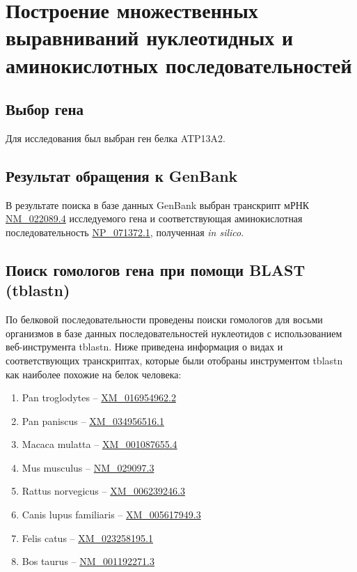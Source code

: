 \documentclass[a4paper,12pt]{article} %
\begin{document}
	
	
	\section{Построение множественных выравниваний нуклеотидных и аминокислотных последовательностей}
	\label{section:alns}
	\subsection{Выбор гена}
	Для исследования был выбран ген белка ATP13A2.
	\subsection{Результат обращения к GenBank}
	В результате поиска в базе данных GenBank выбран транскрипт мРНК \href{https://www.ncbi.nlm.nih.gov/nuccore/NM_022089.4}{NM\_022089.4} исследуемого гена и соответствующая аминокислотная последовательность \href{https://www.ncbi.nlm.nih.gov/protein/13435129}{NP\_071372.1}, полученная \textit{in silico}.
	\subsection{Поиск гомологов гена при помощи BLAST (tblastn)}
	По белковой последовательности проведены поиски гомологов для восьми организмов в базе данных последовательностей нуклеотидов с использованием веб-инструмента tblastn. Ниже приведена информация о видах и соответствующих транскриптах, которые были отобраны инструментом tblastn как наиболее похожие на белок человека:
	\begin{enumerate}
		\item Pan troglodytes -- \href{https://www.ncbi.nlm.nih.gov/nuccore/XM_016954962.2}{XM\_016954962.2} 
		\item Pan paniscus -- \href{https://www.ncbi.nlm.nih.gov/nuccore/XM_034956516.1}{XM\_034956516.1} 
		\item Macaca mulatta -- \href{https://www.ncbi.nlm.nih.gov/nuccore/XM_001087655.4}{XM\_001087655.4}
		\item Mus musculus -- \href{https://www.ncbi.nlm.nih.gov/nuccore/NM_029097.3}{NM\_029097.3}
		\item Rattus norvegicus -- \href{https://www.ncbi.nlm.nih.gov/nuccore/XM_006239246.3}{XM\_006239246.3}
		\item Canis lupus familiaris -- \href{https://www.ncbi.nlm.nih.gov/nuccore/XM_005617949.3}{XM\_005617949.3}
		\item Felis catus -- \href{https://www.ncbi.nlm.nih.gov/nuccore/XM_023258195.1}{XM\_023258195.1}
		\item Bos taurus -- \href{https://www.ncbi.nlm.nih.gov/nuccore/NM_001192271.3}{NM\_001192271.3}
	\end{enumerate}
\end{document}
